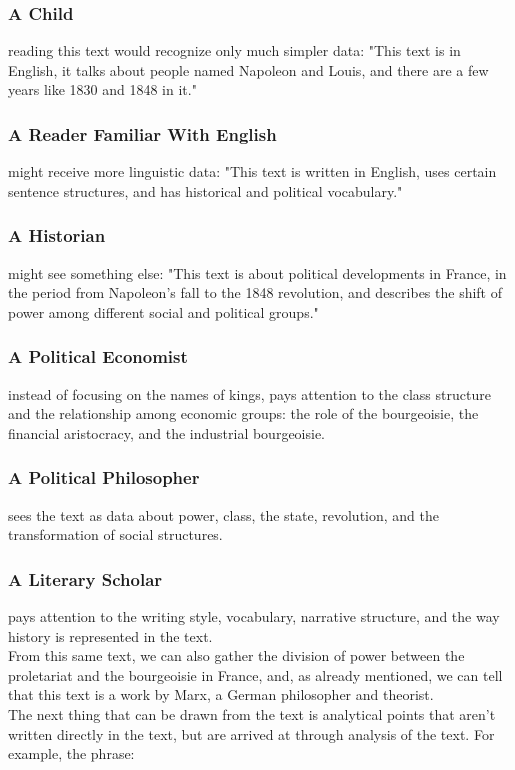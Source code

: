 \subsubsection{A Child}
reading this text would recognize only much simpler data: "This text is in English, it talks about people named Napoleon and Louis, and there are a few years like 1830 and 1848 in it."
\subsubsection{A Reader Familiar With English}
might receive more linguistic data: "This text is written in English, uses certain sentence structures, and has historical and political vocabulary."
\subsubsection{A Historian}
might see something else: "This text is about political developments in France, in the period from Napoleon's fall to the 1848 revolution, and describes the shift of power among different social and political groups."
\subsubsection{A Political Economist}
instead of focusing on the names of kings, pays attention to the class structure and the relationship among economic groups: the role of the bourgeoisie, the financial aristocracy, and the industrial bourgeoisie.
\subsubsection{A Political Philosopher}
sees the text as data about power, class, the state, revolution, and the transformation of social structures.
\subsubsection{A Literary Scholar}
pays attention to the writing style, vocabulary, narrative structure, and the way history is represented in the text.\\
From this same text, we can also gather the division of power between the proletariat and the bourgeoisie in France, and, as already mentioned, we can tell that this text is a work by Marx, a German philosopher and theorist.\\
The next thing that can be drawn from the text is analytical points that aren't written directly in the text, but are arrived at through analysis of the text. For example, the phrase:

